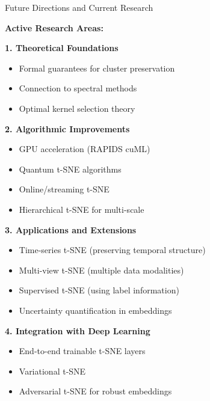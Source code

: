 \documentclass[10pt]{beamer}
\begin{document}
\begin{frame}{Future Directions and Current Research}

\textbf{Active Research Areas:}

\vspace{0.2cm}
\textbf{1. Theoretical Foundations}
\begin{itemize}
    \setlength\itemsep{0em}
    \item Formal guarantees for cluster preservation
    \item Connection to spectral methods
    \item Optimal kernel selection theory
\end{itemize}

\vspace{0.15cm}
\textbf{2. Algorithmic Improvements}
\begin{itemize}
    \setlength\itemsep{0em}
    \item GPU acceleration (RAPIDS cuML)
    \item Quantum t-SNE algorithms
    \item Online/streaming t-SNE
    \item Hierarchical t-SNE for multi-scale
\end{itemize}

\vspace{0.15cm}
\textbf{3. Applications and Extensions}
\begin{itemize}
    \setlength\itemsep{0em}
    \item Time-series t-SNE (preserving temporal structure)
    \item Multi-view t-SNE (multiple data modalities)
    \item Supervised t-SNE (using label information)
    \item Uncertainty quantification in embeddings
\end{itemize}

\vspace{0.15cm}
\textbf{4. Integration with Deep Learning}
\begin{itemize}
    \setlength\itemsep{0em}
    \item End-to-end trainable t-SNE layers
    \item Variational t-SNE
    \item Adversarial t-SNE for robust embeddings
\end{itemize}

\end{frame}
\end{document}
